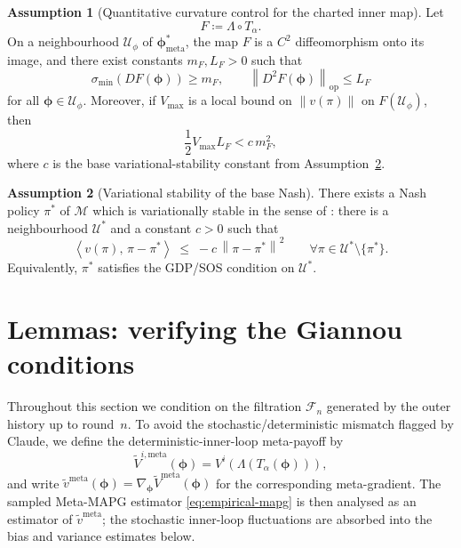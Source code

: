 \documentclass[11pt]{article}
\theoremstyle{definition}
\newtheorem{assumption}{Assumption}
\newcommand{\norm}[1]{\left\lVert #1 \right\rVert}
\newcommand{\inner}[2]{\left\langle #1,\,#2 \right\rangle}
\newcommand{\calF}{\mathcal{F}}
\newcommand{\calM}{\mathcal{M}}
\newcommand{\calU}{\mathcal{U}}
\newcommand{\meta}{\mathrm{meta}}
\begin{document}
\begin{assumption}[Quantitative curvature control for the charted inner map]\label{ass:curvature}
Let
\[
F \coloneqq \Lambda\circ T_\alpha.
\]
On a neighbourhood $\calU_\phi$ of $\bm\phi^*_\meta$, the map $F$ is a $C^2$ diffeomorphism onto its image, and there exist constants $m_F,L_F>0$ such that
\[
\sigma_{\min}(DF(\bm\phi))\ge m_F,
\qquad
\norm{D^2F(\bm\phi)}_{\mathrm{op}}\le L_F
\]
for all $\bm\phi\in\calU_\phi$. Moreover, if $V_{\max}$ is a local bound on $\norm{v(\pi)}$ on $F(\calU_\phi)$, then
\begin{equation}\label{eq:curvature-dominance}
\frac{1}{2}V_{\max}L_F < c\,m_F^2,
\end{equation}
where $c$ is the base variational-stability constant from Assumption~\ref{ass:stability}.
\end{assumption}

\begin{assumption}[Variational stability of the base Nash]\label{ass:stability}
There exists a Nash policy $\pi^*$ of $\calM$ which is variationally stable in the sense of \cite[Def.~2]{Giannou2022}: there is a neighbourhood $\calU^*$ and a constant $c>0$ such that
\begin{equation}\label{eq:vs}
\inner{v(\pi)}{\pi-\pi^*}\;\le\;-c\,\norm{\pi-\pi^*}^2
\qquad\forall\pi\in\calU^*\setminus\{\pi^*\}.
\end{equation}
Equivalently, $\pi^*$ satisfies the GDP/SOS condition on $\calU^*$.
\end{assumption}

\section{Lemmas: verifying the Giannou conditions}

Throughout this section we condition on the filtration $\calF_n$ generated by the outer history up to round~$n$. To avoid the stochastic/deterministic mismatch flagged by Claude, we define the deterministic-inner-loop meta-payoff by
\[
\widetilde V^{i,\meta}(\bm\phi)=V^i(\Lambda(T_\alpha(\bm\phi))),
\]
and write $\widetilde v^\meta(\bm\phi)=\nabla_{\bm\phi}\widetilde V^\meta(\bm\phi)$ for the corresponding meta-gradient. The sampled Meta-MAPG estimator \eqref{eq:empirical-mapg} is then analysed as an estimator of $\widetilde v^\meta$; the stochastic inner-loop fluctuations are absorbed into the bias and variance estimates below.
\end{document}
